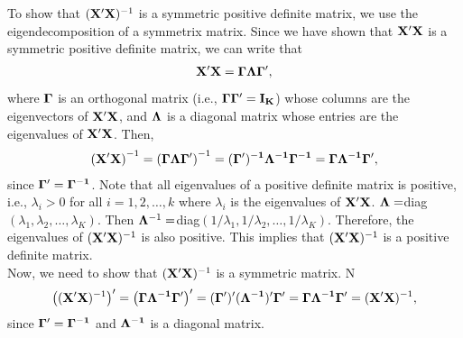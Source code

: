 \documentclass[12pt,a4paper]{article}
\begin{document}
\begin{enumerate}
To show that $({\bf X'X})^{-1}$ is a symmetric positive definite matrix, we use the eigendecomposition of a symmetrix matrix. Since we have shown that ${\bf X'X}$ is a symmetric positive definite matrix, we can write that
\begin{align*}
{\bf X'X}={\bf \Gamma \Lambda \Gamma'},
\end{align*}
where ${\bf \Gamma}$ is an orthogonal matrix (i.e., ${\bf \Gamma \Gamma'}={\bf I_{K}}$) whose columns are the eigenvectors of ${\bf X'X}$, and ${\bf \Lambda}$ is a diagonal matrix whose entries are the eigenvalues of ${\bf X'X}$. Then,
\begin{align*}
\left({\bf X'X}\right)^{-1}=\left({\bf \Gamma \Lambda \Gamma'}\right)^{-1}={\bf (\Gamma')^{-1}\Lambda^{-1}\Gamma^{-1}}={\bf \Gamma \Lambda^{-1} \Gamma'},
\end{align*}
since ${\bf \Gamma'=\Gamma^{-1}}$. Note that all eigenvalues of a positive definite matrix is positive, i.e., $\lambda_{i}>0$ for all $i=1,2,\dots,k$ where $\lambda_{i}$ is the eigenvalues of ${\bf X'X}$. ${\bf \Lambda}=$diag$(\lambda_{1},\lambda_{2},\dots,\lambda_{K})$. Then ${\bf \Lambda}^{-1}=$diag$(1/\lambda_{1}, 1/\lambda_{2},\dots,1/\lambda_{K})$. Therefore, the eigenvalues of $({\bf X'X})^{-1}$ is also positive. This implies that $({\bf X'X})^{-1}$ is a positive definite matrix.\\
Now, we need to show that $({\bf X'X})^{-1}$ is a symmetric matrix. N
\begin{align*}
\left(({\bf X'X})^{-1}\right)'=\left({\bf \Gamma \Lambda^{-1} \Gamma'} \right)'={\bf (\Gamma')' (\Lambda^{-1})' \Gamma'}={\bf \Gamma \Lambda^{-1} \Gamma'}=({\bf X'X})^{-1},
\end{align*}
since ${\bf \Gamma'=\Gamma^{-1}}$ and ${\bf \Lambda^{-1}}$ is a diagonal matrix.



\end{enumerate}
\end{document}
